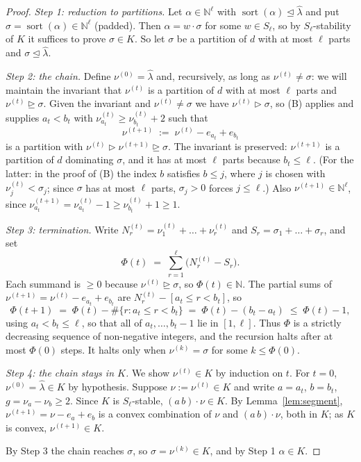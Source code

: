 \documentclass[11pt]{article}
\theoremstyle{plain}
\theoremstyle{definition}
\DeclareMathOperator{\srt}{sort}
\newcommand{\N}{\mathbb{N}}
\newcommand{\lhat}{\hat\lambda}
\begin{document}
\begin{proof}
\emph{Step 1: reduction to partitions.} Let $\alpha\in\N^{\ell}$ with
$\srt(\alpha)\trianglelefteq\lhat$ and put $\sigma=\srt(\alpha)\in\N^{\ell}$
(padded). Then $\alpha=w\cdot\sigma$ for some $w\in S_\ell$, so by
$S_\ell$-stability of $K$ it suffices to prove $\sigma\in K$. So let $\sigma$ be
a partition of $d$ with at most $\ell$ parts and $\sigma\trianglelefteq\lhat$.

\emph{Step 2: the chain.} Define $\nu^{(0)}=\lhat$ and, recursively, as long as
$\nu^{(t)}\ne\sigma$: we will maintain the invariant that $\nu^{(t)}$ is a
partition of $d$ with at most $\ell$ parts and
$\nu^{(t)}\trianglerighteq\sigma$. Given the invariant and $\nu^{(t)}\ne\sigma$
we have $\nu^{(t)}\rhd\sigma$, so (B) applies and supplies $a_t<b_t$ with
$\nu^{(t)}_{a_t}\ge\nu^{(t)}_{b_t}+2$ such that
\[
  \nu^{(t+1)}\;:=\;\nu^{(t)}-e_{a_t}+e_{b_t}
\]
is a partition with $\nu^{(t)}\rhd\nu^{(t+1)}\trianglerighteq\sigma$. The
invariant is preserved: $\nu^{(t+1)}$ is a partition of $d$ dominating $\sigma$,
and it has at most $\ell$ parts because $b_t\le\ell$. (For the latter: in the
proof of (B) the index $b$ satisfies $b\le j$, where $j$ is chosen with
$\nu^{(t)}_j<\sigma_j$; since $\sigma$ has at most $\ell$ parts, $\sigma_j>0$
forces $j\le\ell$.) Also $\nu^{(t+1)}\in\N^{\ell}$, since
$\nu^{(t+1)}_{a_t}=\nu^{(t)}_{a_t}-1\ge\nu^{(t)}_{b_t}+1\ge 1$.

\emph{Step 3: termination.} Write $N^{(t)}_r=\nu^{(t)}_1+\dots+\nu^{(t)}_r$ and
$S_r=\sigma_1+\dots+\sigma_r$, and set
\[
  \Phi(t)\;=\;\sum_{r=1}^{\ell}\bigl(N^{(t)}_r-S_r\bigr).
\]
Each summand is $\ge 0$ because $\nu^{(t)}\trianglerighteq\sigma$, so
$\Phi(t)\in\N$. The partial sums of $\nu^{(t+1)}=\nu^{(t)}-e_{a_t}+e_{b_t}$ are
$N^{(t)}_r-[a_t\le r<b_t]$, so
\[
  \Phi(t+1)\;=\;\Phi(t)-\#\{r: a_t\le r<b_t\}\;=\;\Phi(t)-(b_t-a_t)\;\le\;\Phi(t)-1,
\]
using $a_t<b_t\le\ell$, so that all of $a_t,\dots,b_t-1$ lie in $[1,\ell]$.
Thus $\Phi$ is a strictly decreasing sequence of non-negative integers, and the
recursion halts after at most $\Phi(0)$ steps. It halts only when
$\nu^{(k)}=\sigma$ for some $k\le\Phi(0)$.

\emph{Step 4: the chain stays in $K$.} We show $\nu^{(t)}\in K$ by induction on
$t$. For $t=0$, $\nu^{(0)}=\lhat\in K$ by hypothesis. Suppose $\nu:=\nu^{(t)}\in
K$ and write $a=a_t$, $b=b_t$, $g=\nu_a-\nu_b\ge 2$. Since $K$ is
$S_\ell$-stable, $(a\,b)\cdot\nu\in K$. By Lemma~\ref{lem:segment},
$\nu^{(t+1)}=\nu-e_a+e_b$ is a convex combination of $\nu$ and
$(a\,b)\cdot\nu$, both in $K$; as $K$ is convex, $\nu^{(t+1)}\in K$.

By Step 3 the chain reaches $\sigma$, so $\sigma=\nu^{(k)}\in K$, and by Step 1
$\alpha\in K$.
\end{proof}
\end{document}
